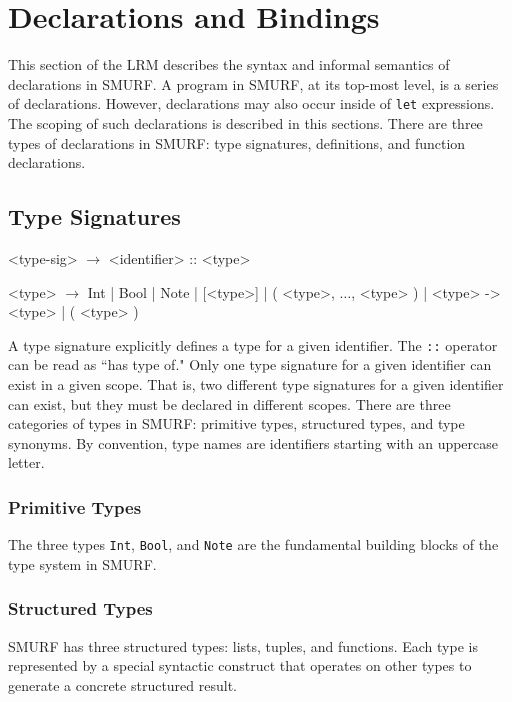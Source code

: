 \section{Declarations and Bindings}

This section of the LRM describes the syntax and informal semantics of
declarations in SMURF. A program in SMURF, at its top-most level, is a
series of declarations. However, declarations may also occur inside of
\texttt{let} expressions. The scoping of such declarations is described 
in this sections. There are three types of declarations in SMURF: 
type signatures, definitions, and function declarations.

\subsection{Type Signatures}

\begin{grammar}

<type-sig> $\rightarrow$ <identifier> :: <type>

<type> $\rightarrow$ Int | Bool | Note | [<type>] | 
										( <type>, $\ldots$, <type> ) | <type> -> <type> | ( <type> )
										

\end{grammar}

A type signature explicitly defines a type for a given identifier. The
\texttt{::} operator can be read as ``has type of." Only one type signature
for a given identifier can exist in a given scope. That is, two different
type signatures for a given identifier can exist, but they must be declared
in different scopes. There are three categories of types in SMURF: primitive
types,  structured types, and type synonyms. By convention, type
names are identifiers starting with an uppercase letter.

\subsubsection{Primitive Types}

The three types \texttt{Int}, \texttt{Bool}, and \texttt{Note} are
the fundamental building blocks of the type system in SMURF. 

\subsubsection{Structured Types}

SMURF has three structured types: lists, tuples, and functions. Each
type is represented by a special syntactic construct that operates on
other types to generate a concrete structured result.

